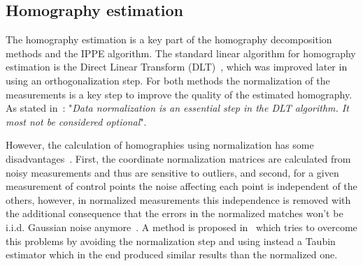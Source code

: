 \documentclass[letterpaper, 10 pt, conference]{ieeeconf}  %
\begin{document}
\subsection{Homography estimation}
The homography estimation is a key part of the homography decomposition methods and the IPPE algorithm. The standard linear algorithm for homography estimation is the Direct Linear Transform (DLT)~\cite{RichardHartley2003}, which was improved later in~\cite{Harker2005} using an orthogonalization step. For both methods the normalization of the measurements is a key step to improve the quality of the estimated homography. As stated in~\cite{RichardHartley2003}: "\textit{Data normalization is an essential step in the DLT algorithm. It most not be considered optional}".

However, the calculation of homographies using normalization has some disadvantages~\cite{Rangarajan2009}. First, the coordinate normalization matrices are calculated from noisy measurements and thus are sensitive to outliers, and second, for a given measurement of control points the noise affecting each point is independent of the others, however, in normalized measurements this independence is removed with the additional consequence that the errors in the normalized matches won't be i.i.d. Gaussian noise anymore~\cite{Chen2009}. A method is proposed in~\cite{Rangarajan2009} which tries to overcome this problems by avoiding the normalization step and using instead a Taubin estimator which in the end produced similar results than the normalized one.






\end{document}
